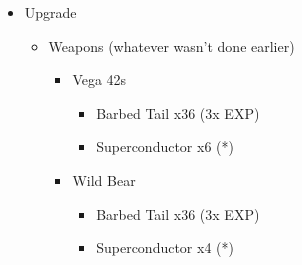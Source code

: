 \begin{multicols}{2}
	\begin{upgrade}
		\begin{itemize}
			\item Upgrade
			      \begin{itemize}
				      \item Weapons (whatever wasn't done earlier)
				            \begin{itemize}
					            \item Vega 42s
					                  \begin{itemize}
						                  \item Barbed Tail x36 (3x EXP)
						                  \item Superconductor x6 (*)
					                  \end{itemize}
					            \item Wild Bear
					                  \begin{itemize}
						                  \item Barbed Tail x36 (3x EXP)
						                  \item Superconductor x4 (*)
					                  \end{itemize}


\end{itemize}
\end{itemize}
\end{itemize}
\end{upgrade}
\end{multicols}

